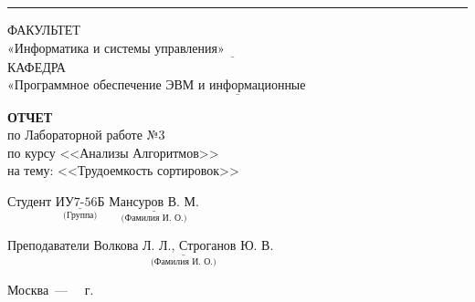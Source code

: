 \begin{titlepage}
	\noindent\rule{18cm}{3pt}
	\newline\newline
	\noindent ФАКУЛЬТЕТ $\underline{\text{«Информатика и системы управления»~~~~~~~~~~~~~~~~~~~~~~~~~~~~~~~~~~~~~~~~~~~~~~~~~~~~~~~}}$ \newline\newline
	\noindent КАФЕДРА $\underline{\text{«Программное обеспечение ЭВМ и информационные технологии»~~~~~~~~~~~~~~~~~~~~~~~}}$\newline\newline\newline\newline\newline\newline\newline
	
	
	\begin{center}
		\textbf{ОТЧЕТ} \\
		по Лабораторной работе №3\\
		по курсу <<Анализы Алгоритмов>> \\
		на тему: <<Трудоемкость сортировок>>
	\end{center}

	\vfill
	\vfill
	\vfill
	Студент $\underset{\text{(Группа)}}{\underline{\text{ИУ7-56Б}}}$
	\hfill
	$\underset{\text{(Фамилия~И.~О.)}}{\underline{\text{Мансуров~В.~М.}}}$
	
	Преподаватели 
	\hfill
	$\underset{\text{(Фамилия~И.~О.)}}{\underline{\text{Волкова~Л.~Л., Строганов~Ю.~В.}}}$
	
	\begin{center}
		\vfill
		Москва~---~\the\year
		~г.
	\end{center}
	\restoregeometry
\end{titlepage}

